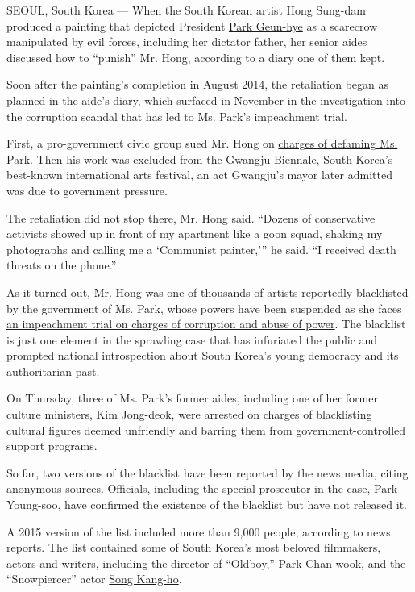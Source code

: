 SEOUL, South Korea --- When the South Korean artist Hong Sung-dam
produced a painting that depicted President
\href{https://www.nytimes.com/topic/person/park-geunhye}{Park Geun-hye}
as a scarecrow manipulated by evil forces, including her dictator
father, her senior aides discussed how to ``punish'' Mr. Hong, according
to a diary one of them kept.

Soon after the painting's completion in August 2014, the retaliation
began as planned in the aide's diary, which surfaced in November in the
investigation into the corruption scandal that has led to Ms. Park's
impeachment trial.

First, a pro-government civic group sued Mr. Hong on
\href{https://www.nytimes.com/2014/08/31/world/asia/an-artist-is-rebuked-for-casting-south-koreas-leader-in-an-unflattering-light.html}{charges
of defaming Ms. Park}. Then his work was excluded from the Gwangju
Biennale, South Korea's best-known international arts festival, an act
Gwangju's mayor later admitted was due to government pressure.

The retaliation did not stop there, Mr. Hong said. ``Dozens of
conservative activists showed up in front of my apartment like a goon
squad, shaking my photographs and calling me a `Communist painter,''' he
said. ``I received death threats on the phone.''

As it turned out, Mr. Hong was one of thousands of artists reportedly
blacklisted by the government of Ms. Park, whose powers have been
suspended as she faces
\href{https://www.nytimes.com/2016/12/22/world/asia/south-korea-president-park-impeachment.html}{an
impeachment trial on charges of corruption and abuse of power}. The
blacklist is just one element in the sprawling case that has infuriated
the public and prompted national introspection about South Korea's young
democracy and its authoritarian past.

On Thursday, three of Ms. Park's former aides, including one of her
former culture ministers, Kim Jong-deok, were arrested on charges of
blacklisting cultural figures deemed unfriendly and barring them from
government-controlled support programs.

So far, two versions of the blacklist have been reported by the news
media, citing anonymous sources. Officials, including the special
prosecutor in the case, Park Young-soo, have confirmed the existence of
the blacklist but have not released it.

A 2015 version of the list included more than 9,000 people, according to
news reports. The list contained some of South Korea's most beloved
filmmakers, actors and writers, including the director of ``Oldboy,''
\href{http://www.imdb.com/title/tt0364569/}{Park Chan-wook}, and the
``Snowpiercer'' actor
\href{http://www.imdb.com/title/tt1706620/?ref_=nv_sr_1}{Song Kang-ho}.

